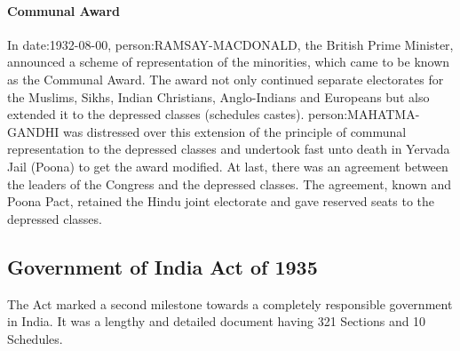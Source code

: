 \paragraph{Communal Award}
In \gls{date:1932-08-00}, \gls{person:RAMSAY-MACDONALD}, the British Prime Minister, announced a scheme of representation of the minorities, which came to be known as the Communal Award. The award not only continued separate electorates for the Muslims, Sikhs, Indian Christians, Anglo-Indians and Europeans but also extended it to the depressed classes (schedules castes). \gls{person:MAHATMA-GANDHI} was distressed over this extension of the principle of communal representation to the depressed classes and undertook fast unto death in Yervada Jail (Poona) to get the award modified. At last, there was an agreement between the leaders of the Congress and the depressed classes. The agreement, known and Poona Pact, retained the Hindu joint electorate and gave reserved seats to the depressed classes.



\subsection{Government of India Act of 1935}

The Act marked a second milestone towards a completely responsible government in India. It was a lengthy and detailed document having 321 Sections and 10 Schedules.

